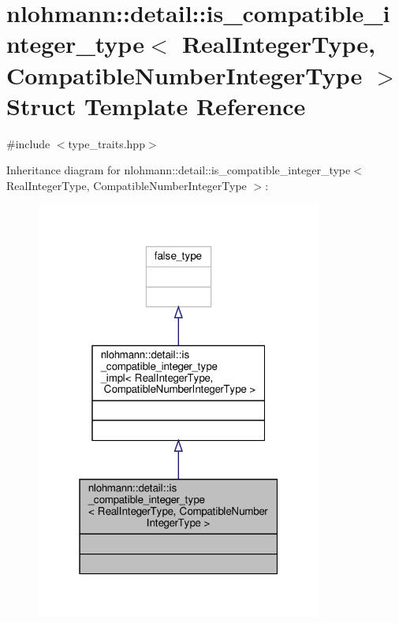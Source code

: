 \hypertarget{structnlohmann_1_1detail_1_1is__compatible__integer__type}{}\section{nlohmann\+:\+:detail\+:\+:is\+\_\+compatible\+\_\+integer\+\_\+type$<$ Real\+Integer\+Type, Compatible\+Number\+Integer\+Type $>$ Struct Template Reference}
\label{structnlohmann_1_1detail_1_1is__compatible__integer__type}


{\ttfamily \#include $<$type\+\_\+traits.\+hpp$>$}



Inheritance diagram for nlohmann\+:\+:detail\+:\+:is\+\_\+compatible\+\_\+integer\+\_\+type$<$ Real\+Integer\+Type, Compatible\+Number\+Integer\+Type $>$\+:\nopagebreak
\begin{figure}[H]
\begin{center}
\leavevmode
\includegraphics[width=268pt]{structnlohmann_1_1detail_1_1is__compatible__integer__type__inherit__graph}
\end{center}
\end{figure}


